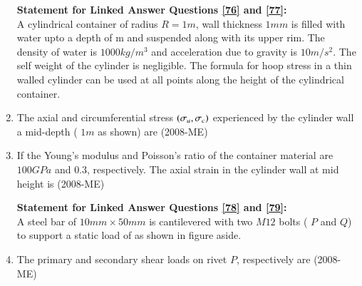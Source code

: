 \documentclass[journal]{IEEEtran}
\begin{document}
\begin{enumerate}
\textbf{Statement for Linked Answer Questions \ref{76} and \ref{77}:} \\ A cylindrical container of radius $R = 1m$, wall thickness 
$1 mm$ is filled with water upto a depth of 
m and suspended along with its upper rim. The density of water is $1000kg/m^3$ and acceleration due to gravity is $10m/s^2$. The self weight of the cylinder is negligible. The formula for hoop stress in a thin walled cylinder can be used at all points along the height of the cylindrical container. \\
  
 \item The axial and circumferential stress $\left(\sigma_a, \sigma_c\right)$ experienced by the cylinder wall a mid-depth (
 $1m$ as shown) are \label{76} \hfill(2008-ME)
\begin{enumerate}
    \end{enumerate}
\item If the Young's modulus and Poisson's ratio of the container material are $100GPa$ and $0.3$, respectively. The axial strain in the cylinder wall at mid height is \label{77} \hfill(2008-ME)
\begin{enumerate}
\end{enumerate}
\textbf{Statement for Linked Answer Questions \ref{78} and \ref{79}:} \\
A steel bar of $10mm \times 50mm$
 is cantilevered with two $M12$
 bolts ( $P$ and $Q$) to support a static load of 
 as shown in figure aside.
 
 \item The primary and secondary shear loads on rivet $P$,
 respectively are \label{78} \hfill(2008-ME)
 \begin{enumerate}
     \begin{multicols}{2}

\end{multicols}
\end{enumerate}
\end{enumerate}
\end{document}
